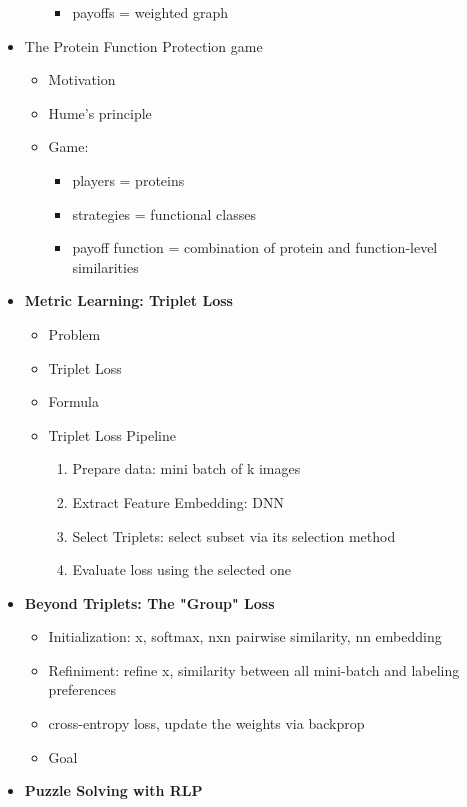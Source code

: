 \documentclass[12pt,oneside]{report}
\begin{document}
\begin{itemize}
\begin{itemize}
\begin{itemize}
            \item payoffs = weighted graph
        \end{itemize}
    \end{itemize}
    \item The Protein Function Protection game
    \begin{itemize}
        \item Motivation
        \item Hume's principle
        \item Game:
        \begin{itemize}
            \item players = proteins
            \item strategies = functional classes
            \item payoff function = combination of protein and function-level similarities
        \end{itemize}
    \end{itemize}
    \item \textbf{Metric Learning: Triplet Loss}
    \begin{itemize}
        \item Problem
        \item Triplet Loss
        \item Formula
        \item Triplet Loss Pipeline
        \begin{enumerate}
            \item Prepare data: mini batch of k images
            \item Extract Feature Embedding: DNN
            \item Select Triplets: select subset via its selection method
            \item Evaluate loss using the selected one
        \end{enumerate}
    \end{itemize}
    \item \textbf{Beyond Triplets: The "Group" Loss}
    \begin{itemize}
        \item Initialization: x, softmax, nxn pairwise similarity, nn embedding
        \item Refiniment: refine x, similarity between all mini-batch and labeling preferences
        \item cross-entropy loss, update the weights via backprop
        \item Goal
    \end{itemize}
    \item \textbf{Puzzle Solving with RLP}
\end{itemize}
\end{document}
